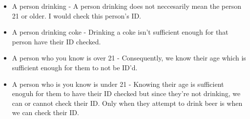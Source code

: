 \documentclass[11pt, a4paper]{article}
\begin{document}
\begin{enumerate}
    \begin{itemize}
        \item A person drinking - A person drinking does not neccesarily mean the person 21 or older. I would check this person's ID.
        \item A person drinking coke - Drinking a coke isn't sufficient enough for that person have their ID checked.
        \item A person who you know is over 21 - Consequently, we know their age which is sufficient enough for them to not be ID'd.
        \item A person who is you know is under 21 - Knowing their age is sufficient enoguh for them to have their ID checked but since they're not drinking, we can or cannot check their ID. Only when they attempt to drink beer is when we can check their ID.
    \end{itemize}
\end{enumerate} 
        
\end{document}
